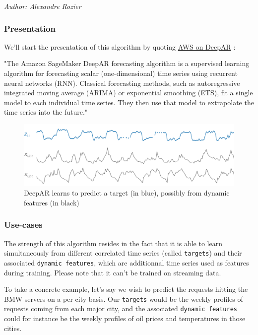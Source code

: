 \textit{Author: Alexandre Rozier} 
\subsubsection{Presentation}
\label{ch:deepar}
We'll start the presentation of this algorithm by quoting \href{https://docs.aws.amazon.com/sagemaker/latest/dg/deepar.html}{AWS on DeepAR}  \cite{awsdeepar}:
\begin{displayquote}
"The Amazon SageMaker DeepAR forecasting algorithm is a supervised learning algorithm for forecasting scalar (one-dimensional) time series using recurrent neural networks (RNN). Classical forecasting methods, such as autoregressive integrated moving average (ARIMA) or exponential smoothing (ETS), fit a single model to each individual time series. They then use that model to extrapolate the time series into the future."
\end{displayquote}

\begin{figure}[h!]
    \centering
    \includegraphics[width=1\textwidth]{images/deepar-explanation.png}
    \caption{DeepAR learns to predict a target (in blue), possibly from dynamic features (in black)}
    \label{fig:deepar-explanation}
\end{figure}


\subsubsection{Use-cases}
The strength of this algorithm resides in the fact that it is able to learn simultaneously from different correlated time series (called \lstinline{targets}) and their associated \lstinline{dynamic features}, which are additionnal time series used as features during training. Please note that it can't be trained on streaming data.

To take a concrete example, let's say we wish to predict the requests hitting the BMW servers on a per-city basis. Our \lstinline{targets} would be the weekly profiles of requests coming from each major city, and the associated \lstinline{dynamic features} could for instance be the weekly profiles of oil prices and temperatures in those cities.

